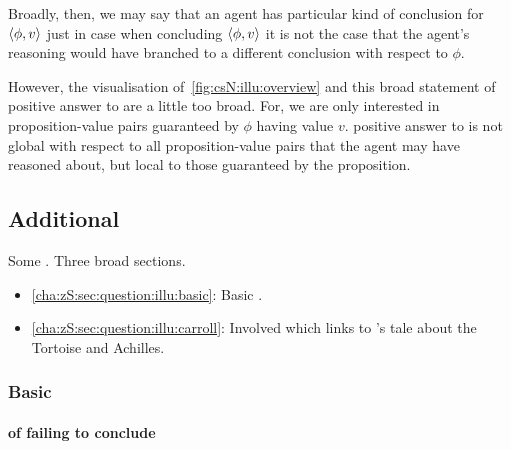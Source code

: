 \begin{note}
  Broadly, then, we may say that an agent has {\color{red} particular kind of conclusion} for \(\langle \phi, v \rangle\) just in case when concluding \(\langle \phi, v \rangle\) it is not the case that the agent's reasoning would have branched to a different conclusion with respect to \(\phi\).

  However, the visualisation of~\autoref{fig:csN:illu:overview} and this broad statement of {\color{red} positive answer to \qzS{}} are a little too broad.
  For, we are only interested in proposition-value pairs guaranteed by \(\phi\) having value \(v\).
  {\color{red} positive answer to \qzS{}} is not global with respect to all proposition-value pairs that the agent may have reasoned about, but local to those guaranteed by the proposition.
\end{note}

\subsection{Additional }
\label{cha:zS:sec:question:illu}

\begin{note}
  Some .
  Three broad sections.

  \begin{itemize}
  \item
    \autoref{cha:zS:sec:question:illu:basic}: Basic .
  \item
    \autoref{cha:zS:sec:question:illu:carroll}: Involved  which links \qzS{} to \citeauthor{Carroll:1895uj}'s tale about the Tortoise and Achilles.
  \end{itemize}
\end{note}

\subsubsection{Basic }
\label{cha:zS:sec:question:illu:basic}

\paragraph{ of failing to conclude}

